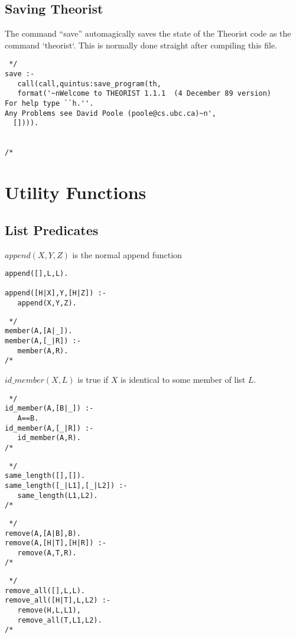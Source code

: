 \subsection{Saving Theorist}
The command ``save'' automagically saves the state of the Theorist code
as the command `theorist`. This is normally done straight after compiling this
file.
\begin{verbatim} */
save :-
   call(call,quintus:save_program(th,
   format('~nWelcome to THEORIST 1.1.1  (4 December 89 version)
For help type ``h.''.
Any Problems see David Poole (poole@cs.ubc.ca)~n',
  []))).


/* \end{verbatim}
\section{Utility Functions}
\subsection{List Predicates}
$append(X,Y,Z)$ is the normal append function
\begin{verbatim} 
append([],L,L).

append([H|X],Y,[H|Z]) :-
   append(X,Y,Z).
\end{verbatim}

\begin{verbatim} */
member(A,[A|_]).
member(A,[_|R]) :-
   member(A,R).
/* \end{verbatim}

$id\_member(X,L)$ is true if $X$ is identical to some member of list $L$.
\begin{verbatim} */
id_member(A,[B|_]) :-
   A==B.
id_member(A,[_|R]) :-
   id_member(A,R).
/* \end{verbatim}

\begin{verbatim} */
same_length([],[]).
same_length([_|L1],[_|L2]) :-
   same_length(L1,L2).
/* \end{verbatim}

\begin{verbatim} */
remove(A,[A|B],B).
remove(A,[H|T],[H|R]) :-
   remove(A,T,R).
/* \end{verbatim}

\begin{verbatim} */
remove_all([],L,L).
remove_all([H|T],L,L2) :-
   remove(H,L,L1),
   remove_all(T,L1,L2).
/* \end{verbatim}

